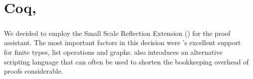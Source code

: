 \chapter{Coq, \ssreflect}

\paragraph{}
We decided to employ the Small Scale Reflection Extension (\textbf{\ssreflect}) for the \textbf{\coq} proof assistant. 
The most important factors in this decision were \ssreflect's excellent support for finite types, list operations and graphs. \ssreflect{} also introduces an alternative scripting language that can often be used to shorten the bookkeeping overhead of proofs considerable.

